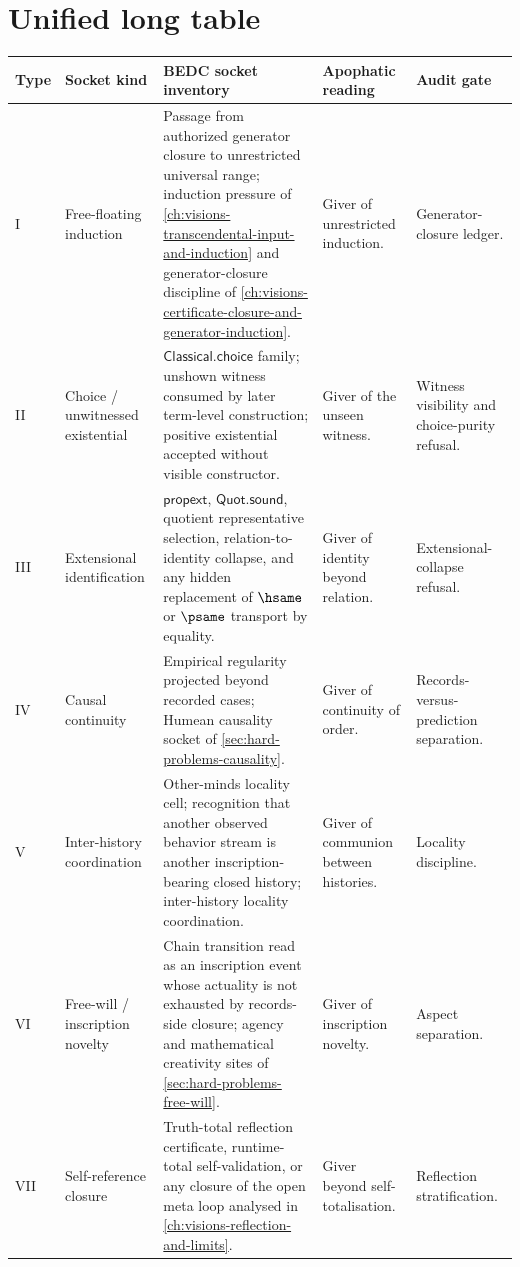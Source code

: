 \section{Unified long table}
\label{sec:transcendental-supply-unified-table}

\begin{longtable}{p{}p{}p{}p{}p{}}
\toprule
\textbf{Type} & \textbf{Socket kind} & \textbf{BEDC socket inventory} & \textbf{Apophatic reading} & \textbf{Audit gate} \\
\midrule
I & Free-floating induction & Passage from authorized generator closure to unrestricted universal range; induction pressure of \autoref{ch:visions-transcendental-input-and-induction} and generator-closure discipline of \autoref{ch:visions-certificate-closure-and-generator-induction}. & Giver of unrestricted induction. & Generator-closure ledger. \\
II & Choice / unwitnessed existential & $\mathsf{Classical.choice}$ family; unshown witness consumed by later term-level construction; positive existential accepted without visible constructor. & Giver of the unseen witness. & Witness visibility and choice-purity refusal. \\
III & Extensional identification & $\mathsf{propext}$, $\mathsf{Quot.sound}$, quotient representative selection, relation-to-identity collapse, and any hidden replacement of $\hsame$ or $\psame$ transport by equality. & Giver of identity beyond relation. & Extensional-collapse refusal. \\
IV & Causal continuity & Empirical regularity projected beyond recorded cases; Humean causality socket of \autoref{sec:hard-problems-causality}. & Giver of continuity of order. & Records-versus-prediction separation. \\
V & Inter-history coordination & Other-minds locality cell; recognition that another observed behavior stream is another inscription-bearing closed history; inter-history locality coordination. & Giver of communion between histories. & Locality discipline. \\
VI & Free-will / inscription novelty & Chain transition read as an inscription event whose actuality is not exhausted by records-side closure; agency and mathematical creativity sites of \autoref{sec:hard-problems-free-will}. & Giver of inscription novelty. & Aspect separation. \\
VII & Self-reference closure & Truth-total reflection certificate, runtime-total self-validation, or any closure of the open meta loop analysed in \autoref{ch:visions-reflection-and-limits}. & Giver beyond self-totalisation. & Reflection stratification. \\
\bottomrule
\end{longtable}


